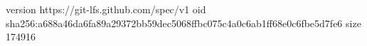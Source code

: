 version https://git-lfs.github.com/spec/v1
oid sha256:a688a46da6fa89a29372bb59dec5068ffbc075c4a0c6ab1ff68e0c6fbe5d7fe6
size 174916
